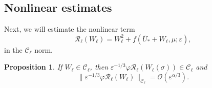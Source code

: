 \documentclass[letterpaper,11pt]{article}
\newcommand{\Ral}{\mathcal{R}}
\newcommand{\rmO}{\mathcal{O}}
\newcommand{\eps}{\varepsilon}
\numberwithin{equation}{section}
\theoremstyle{plain}
\newtheorem{proposition}[theorem]{Proposition}
\begin{document}
\subsection{Nonlinear estimates}

Next, we will estimate the nonlinear term 
\[
\Ral_{\ell} (W_\ell)=W_\ell^2 + f(\bar{U}_*+W_\ell, \mu;\eps),
\]
 in the $\mathcal{C}_\ell$ norm. 
\begin{proposition}\label{nl_est_l}
If $W_\ell \in \mathcal{C}_{\ell}$, then $ \eps^{-1/3}\varphi \Ral_\ell(W_\ell(\sigma))  \in \mathcal{C}_\ell$ and 
\begin{equation}\label{nl_est:Rl}
\| \eps^{-1/3}\varphi \Ral_\ell(W_\ell) \|_{\mathcal{C}_\ell} = \rmO(\eps^{\alpha/3}).
\end{equation}
\end{proposition}
\end{document}
